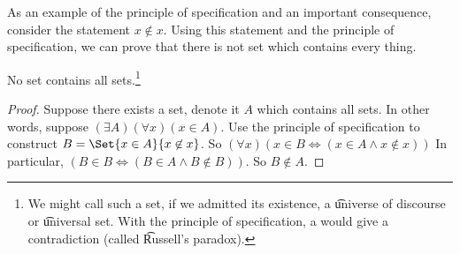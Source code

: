




As an example of the principle of specification and an important consequence, consider the statement $x \not\in x$.
Using this statement and the principle of specification, we can prove that there is not set which contains every thing.

\begin{proposition}
  No set contains all sets.\footnote{We might call such a set, if we admitted its existence, a \t{universe of discourse} or \t{universal set}.
  With the principle of specification, a  would give a contradiction (called \t{Russell's paradox}).}
\begin{proof}
  Suppose there exists a set, denote it $A$ which contains all sets.
  In other words, suppose $(\exists A)(\forall x)(x \in A)$.
  Use the principle of specification to construct $B = \Set{x \in A}{x \not\in x}$.
  So $(\forall x)(x \in B \iff (x \in A \land x \not\in x))$
  In particular, $(B \in B \iff (B \in A \land B \not\in B))$.
  So $B \not \in A$.
\end{proof}
\end{proposition}



%
%


